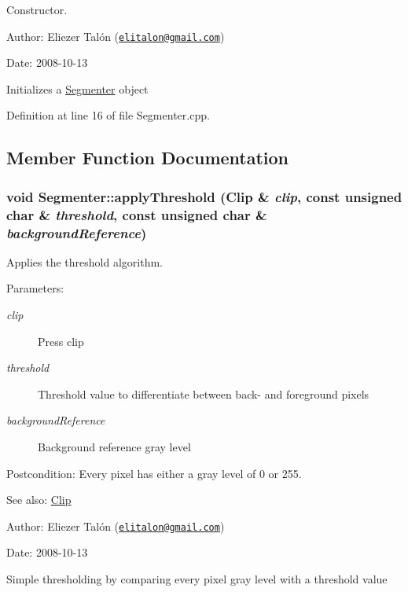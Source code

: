 Constructor. 

\begin{Desc}
\item[Author:]Eliezer Talón (\href{mailto:elitalon@gmail.com}{\tt elitalon@gmail.com}) \end{Desc}
\begin{Desc}
\item[Date:]2008-10-13\end{Desc}
Initializes a \hyperlink{class_segmenter}{Segmenter} object 

Definition at line 16 of file Segmenter.cpp.

\subsection{Member Function Documentation}
\hypertarget{class_segmenter_6854315e3320f9d9a8ece14cbb8570ee}{
\subsubsection[applyThreshold]{\setlength{\rightskip}{0pt plus 5cm}void Segmenter::applyThreshold ({\bf Clip} \& {\em clip}, \/  const unsigned char \& {\em threshold}, \/  const unsigned char \& {\em backgroundReference})}}
\label{class_segmenter_6854315e3320f9d9a8ece14cbb8570ee}


Applies the threshold algorithm. 

\begin{Desc}
\item[Parameters:]
\begin{description}
\item[{\em clip}]Press clip \item[{\em threshold}]Threshold value to differentiate between back- and foreground pixels \item[{\em backgroundReference}]Background reference gray level\end{description}
\end{Desc}
\begin{Desc}
\item[Postcondition:]Every pixel has either a gray level of 0 or 255.\end{Desc}
\begin{Desc}
\item[See also:]\hyperlink{class_clip}{Clip}\end{Desc}
\begin{Desc}
\item[Author:]Eliezer Talón (\href{mailto:elitalon@gmail.com}{\tt elitalon@gmail.com}) \end{Desc}
\begin{Desc}
\item[Date:]2008-10-13\end{Desc}
Simple thresholding by comparing every pixel gray level with a threshold value 

